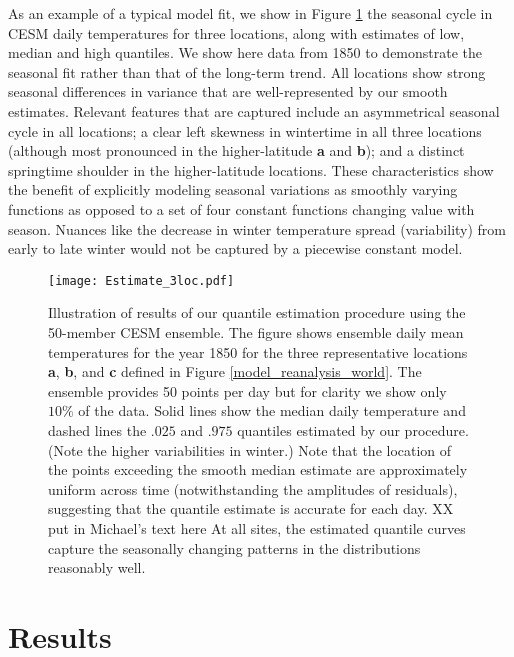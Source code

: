 \documentclass{ametsoc}
\newcommand\smallfigwidth{\columnwidth}
\begin{document}
 As an example of a typical model fit, we show in Figure \ref{Estimate} the seasonal cycle in CESM daily temperatures for three locations, along with estimates of low, median and high quantiles. We show here data from 1850 to demonstrate the seasonal fit rather than that of the long-term trend. All locations show strong seasonal differences in variance that are well-represented by our smooth estimates. Relevant features that are captured include an asymmetrical seasonal cycle in all locations; a clear left skewness in wintertime in all three locations (although most pronounced in the higher-latitude \textbf{a} and \textbf{b}); and a distinct springtime shoulder in the higher-latitude locations. These characteristics show the benefit of explicitly modeling seasonal variations as smoothly varying functions as opposed to a set of four constant functions changing value with season. Nuances like the decrease in winter temperature spread (variability) from early to late winter would not be captured by a piecewise constant model.

\begin{figure}[t]       %
\centerline{\texttt{[image: Estimate\_3loc.pdf]}}
\caption{\small{Illustration of results of our quantile estimation procedure using the 50-member CESM ensemble. The figure shows ensemble daily mean temperatures for the year 1850 for the three representative locations \textbf{a}, \textbf{b}, and \textbf{c} defined in Figure \ref{model_reanalysis_world}. The ensemble provides 50 points per day but for clarity we show only $10\%$ of the data. Solid lines show the median daily temperature and dashed lines the $.025$ and $.975$ quantiles estimated by our procedure. %
(Note the higher variabilities in winter.)  Note that the location of the points exceeding the smooth median estimate are approximately uniform across time (notwithstanding the amplitudes of residuals), suggesting that the quantile estimate is accurate for each day. XX put in Michael's text here
At all sites, the estimated quantile curves capture the seasonally changing patterns in the distributions reasonably well.
}} 

\label{Estimate}          %
\end{figure}

\section{Results}
\label{sec:results}
\end{document}
